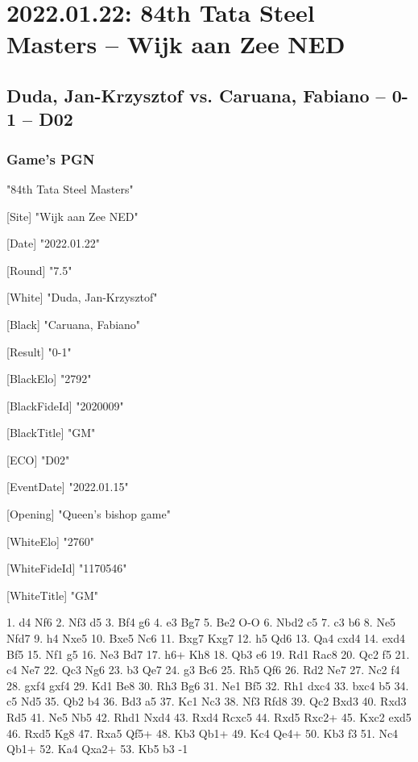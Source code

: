 \documentclass[9pt]{extarticle}
\begin{document}
\section*{2022.01.22: 84th Tata Steel Masters -- Wijk aan Zee NED}

\subsection*{Duda, Jan-Krzysztof vs. Caruana, Fabiano -- 0-1 -- D02}
\subsubsection*{Game's PGN}
\begin{flushleft}
[Event] "84th Tata Steel Masters"

[Site] "Wijk aan Zee NED"

[Date] "2022.01.22"

[Round] "7.5"

[White] "Duda, Jan-Krzysztof"

[Black] "Caruana, Fabiano"

[Result] "0-1"

[BlackElo] "2792"

[BlackFideId] "2020009"

[BlackTitle] "GM"

[ECO] "D02"

[EventDate] "2022.01.15"

[Opening] "Queen's bishop game"

[WhiteElo] "2760"

[WhiteFideId] "1170546"

[WhiteTitle] "GM"

\end{flushleft}
\begin{flushleft}
1. d4 Nf6 2. Nf3 d5 3. Bf4 g6 4. e3 Bg7 5. Be2 O-O 6. Nbd2 c5 7. c3 b6 8. Ne5 Nfd7 9. h4 Nxe5 10. Bxe5 Nc6 11. Bxg7 Kxg7 12. h5 Qd6 13. Qa4 cxd4 14. exd4 Bf5 15. Nf1 g5 16. Ne3 Bd7 17. h6+ Kh8 18. Qb3 e6 19. Rd1 Rac8 20. Qc2 f5 21. c4 Ne7 22. Qc3 Ng6 23. b3 Qe7 24. g3 Bc6 25. Rh5 Qf6 26. Rd2 Ne7 27. Nc2 f4 28. gxf4 gxf4 29. Kd1 Be8 30. Rh3 Bg6 31. Ne1 Bf5 32. Rh1 dxc4 33. bxc4 b5 34. c5 Nd5 35. Qb2 b4 36. Bd3 a5 37. Kc1 Nc3 38. Nf3 Rfd8 39. Qc2 Bxd3 40. Rxd3 Rd5 41. Ne5 Nb5 42. Rhd1 Nxd4 43. Rxd4 Rcxc5 44. Rxd5 Rxc2+ 45. Kxc2 exd5 46. Rxd5 Kg8 47. Rxa5 Qf5+ 48. Kb3 Qb1+ 49. Kc4 Qe4+ 50. Kb3 f3 51. Nc4 Qb1+ 52. Ka4 Qxa2+ 53. Kb5 b3 \quad  {}-1
\end{flushleft}
\parindent 0mm
\end{document}
